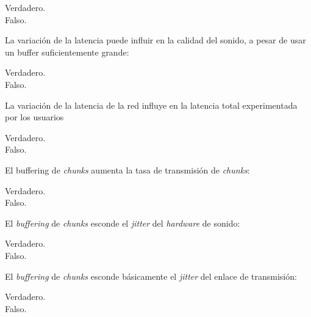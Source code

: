 \documentclass[legalpaper, 12pt, addpoints]{exam}
\begin{document}
\begin{questions}
\begin{oneparchoices}
  \choice Verdadero.\\
  \choice Falso.
\end{oneparchoices}
  
\vspace{0.10in}

\question La variación de la latencia puede influir en la calidad del
sonido, a pesar de usar un buffer suficientemente grande:

\begin{oneparchoices}
  \choice Verdadero.\\
  \choice Falso.
\end{oneparchoices}
  
\vspace{0.10in}

\question La variación de la latencia de la red influye en la latencia
total experimentada por los usuarios

\begin{oneparchoices}
  \choice Verdadero.\\
  \choice Falso.
\end{oneparchoices}
  
\vspace{0.10in}

\question El buffering de \emph{chunks} aumenta la tasa de transmisión
de \emph{chunks}:

\begin{oneparchoices}
  \choice Verdadero.\\
  \choice Falso.
\end{oneparchoices}
  
\vspace{0.10in}

\question El \emph{buffering} de \emph{chunks} esconde el
\emph{jitter} del \emph{hardware} de sonido:

\begin{oneparchoices}
  \choice Verdadero.\\
  \choice Falso.
\end{oneparchoices}
  
\vspace{0.10in}

\question El \emph{buffering} de \emph{chunks} esconde básicamente el
\emph{jitter} del enlace de transmisión:

\begin{oneparchoices}
  \choice Verdadero.\\
  \choice Falso.
\end{oneparchoices}
  

\end{questions}
\end{document}
